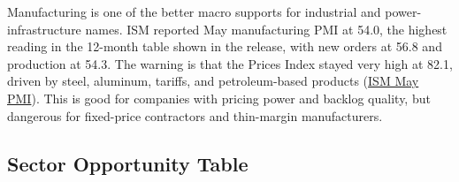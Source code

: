 \documentclass[
  9pt,
]{article}
\begin{document}
Manufacturing is one of the better macro supports for industrial and
power-infrastructure names. ISM reported May manufacturing PMI at 54.0,
the highest reading in the 12-month table shown in the release, with new
orders at 56.8 and production at 54.3. The warning is that the Prices
Index stayed very high at 82.1, driven by steel, aluminum, tariffs, and
petroleum-based products
(\href{https://www.prnewswire.com/news-releases/manufacturing-pmi-at-54-may-2026-ism-manufacturing-pmi-report-302786165.html}{ISM
May PMI}). This is good for companies with pricing power and backlog
quality, but dangerous for fixed-price contractors and thin-margin
manufacturers.

\hypertarget{sector-opportunity-table}{%
\subsection{Sector Opportunity Table}\label{sector-opportunity-table}}
\end{document}
